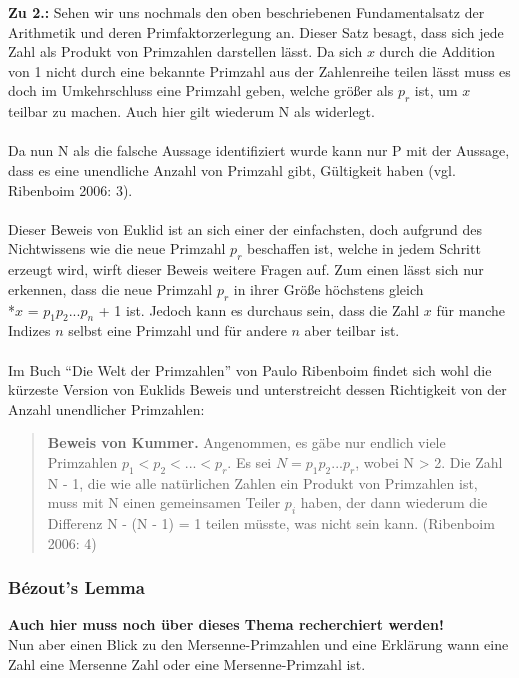\documentclass[german,12pt,a4paper]{article}
\begin{document}
\textbf{Zu 2.:} Sehen wir uns nochmals den oben beschriebenen Fundamentalsatz der Arithmetik und deren Primfaktorzerlegung an. Dieser Satz besagt, dass sich jede Zahl als Produkt von Primzahlen darstellen lässt. Da sich $x$ durch die Addition von 1 nicht durch eine bekannte Primzahl aus der Zahlenreihe teilen lässt muss es doch im Umkehrschluss eine Primzahl geben, welche größer als $p_r$ ist, um $x$ teilbar zu machen. Auch hier gilt wiederum N als widerlegt.\\
\\Da nun N als die falsche Aussage identifiziert wurde kann nur P mit der Aussage, dass es eine unendliche Anzahl von Primzahl gibt, Gültigkeit haben (vgl. Ribenboim 2006: 3).\\
\\Dieser Beweis von Euklid ist an sich einer der einfachsten, doch aufgrund des Nichtwissens wie die neue Primzahl $p_r$ beschaffen ist, welche in jedem Schritt erzeugt wird, wirft dieser Beweis weitere Fragen auf. Zum einen lässt sich nur erkennen, dass die neue Primzahl $p_r$ in ihrer Größe höchstens gleich
\\*$x$ = $p_1p_2...p_n$ + 1 ist. Jedoch kann es durchaus sein, dass die Zahl $x$ für manche Indizes $n$ selbst eine Primzahl und für andere $n$ aber teilbar ist.\\
\\Im Buch “Die Welt der Primzahlen” von Paulo Ribenboim findet sich wohl die kürzeste Version von Euklids Beweis und unterstreicht dessen Richtigkeit von der Anzahl unendlicher Primzahlen:\\
\begin{quote}
\small
\textbf{Beweis von Kummer.} Angenommen, es gäbe nur endlich viele Primzahlen $p_1 < p_2 <...< p_r$. Es sei $N = p_1p_2...p_r$, wobei N > 2. Die Zahl N - 1, die wie alle natürlichen Zahlen ein Produkt von Primzahlen ist, muss mit N einen gemeinsamen Teiler $p_i$ haben, der dann wiederum die Differenz N - (N - 1) = 1 teilen müsste, was nicht sein kann. (Ribenboim 2006: 4)
\end{quote}

\subsubsection{Bézout's Lemma}
\textbf{Auch hier muss noch über dieses Thema recherchiert werden!}\\

Nun aber einen Blick zu den Mersenne-Primzahlen und eine Erklärung wann eine Zahl eine Mersenne Zahl oder eine Mersenne-Primzahl ist.
\end{document}
